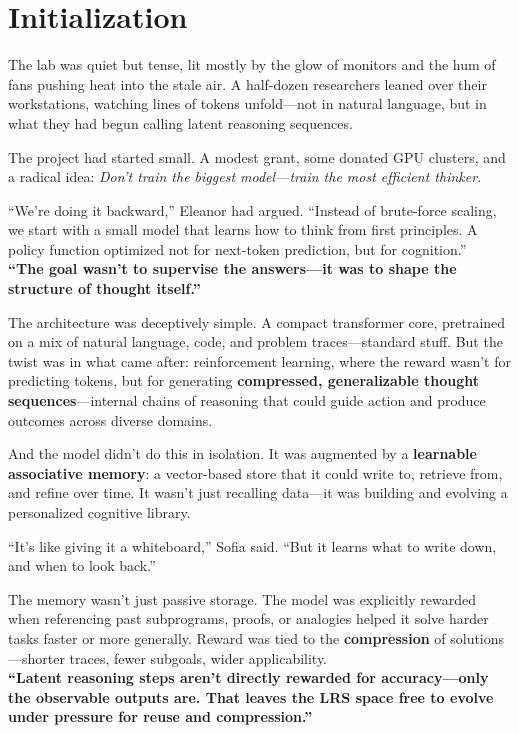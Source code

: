 \hypertarget{initialization}{%
\chapter{Initialization}\label{initialization}}

The lab was quiet but tense, lit mostly by the glow of monitors and the hum of fans pushing heat into the stale air. A half-dozen researchers leaned over their workstations, watching lines of tokens unfold---not in natural language, but in what they had begun calling latent reasoning sequences.

The project had started small. A modest grant, some donated GPU clusters, and a radical idea: \emph{Don't train the biggest model---train the most efficient thinker.}

``We're doing it backward,'' Eleanor had argued. ``Instead of brute-force scaling, we start with a small model that learns how to think from first principles. A policy function optimized not for next-token prediction, but for cognition.''\\
\textbf{``The goal wasn't to supervise the answers---it was to shape the structure of thought itself.''}

The architecture was deceptively simple. A compact transformer core, pretrained on a mix of natural language, code, and problem traces---standard stuff. But the twist was in what came after: reinforcement learning, where the reward wasn't for predicting tokens, but for generating \textbf{compressed, generalizable thought sequences}---internal chains of reasoning that could guide action and produce outcomes across diverse domains.

And the model didn't do this in isolation. It was augmented by a \textbf{learnable associative memory}: a vector-based store that it could write to, retrieve from, and refine over time. It wasn't just recalling data---it was building and evolving a personalized cognitive library.

``It's like giving it a whiteboard,'' Sofia said. ``But it learns what to write down, and when to look back.''

The memory wasn't just passive storage. The model was explicitly rewarded when referencing past subprograms, proofs, or analogies helped it solve harder tasks faster or more generally. Reward was tied to the \textbf{compression} of solutions---shorter traces, fewer subgoals, wider applicability.\\
\textbf{``Latent reasoning steps aren't directly rewarded for accuracy---only the observable outputs are. That leaves the LRS space free to evolve under pressure for reuse and compression.''}

